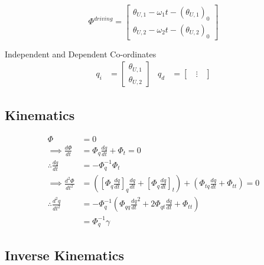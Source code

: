 \begin{equation}
    \Phi^{driving}=
    \begin{bmatrix}
    \theta_{U,1} - \omega_1 t - (\theta_{U,1})_0\\
    \theta_{U,2} - \omega_2 t - (\theta_{U,2})_0
    \end{bmatrix}
\end{equation}

Independent and Dependent Co-ordinates
\begin{align}
    q_i&=
    \begin{bmatrix}
    \theta_{U,1} \\
    \theta_{U,2}
    \end{bmatrix} &
    q_d&=
    \begin{bmatrix}
    \; \; \vdots \; \;
    \end{bmatrix}
\end{align}

\subsection{Kinematics}
\begin{align}
            \Phi &= 0  \nonumber \\
\implies \tfrac{d\Phi}{dt} &=\Phi_q \tfrac{dq}{dt}+ \Phi_t =0 \label{eq:PhiDot} \\
\therefore \tfrac{dq}{dt}&=-\Phi_q^{-1} \Phi_t \\
\implies \tfrac{d^2\Phi}{dt^2} &=([\Phi_{q}\tfrac{dq}{dt}]_q\tfrac{dq}{dt}+[\Phi_{q}\tfrac{dq}{dt}]_t)+(\Phi_{tq}\tfrac{dq}{dt}+\Phi_{tt})=0 \label{eq:PhiDDot} \\
\therefore  \tfrac{d^2q}{dt^2}&=-\Phi_q^{-1} (\Phi_{qq}\tfrac{dq}{dt}^2+2\Phi_{qt}\tfrac{dq}{dt}+\Phi_{tt}) \nonumber \\
                    &=\Phi_q^{-1} \gamma \label{eq:Gamma}
\end{align}


\subsection{Inverse Kinematics}
\label{sec:Inverse2D}

